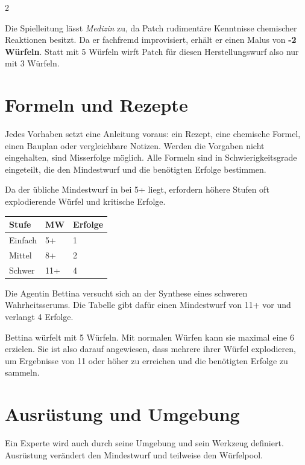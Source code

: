 \begin{multicols}{2}
\begin{pexample}[Beispiel]
Die Spielleitung lässt \textit{Medizin} zu, da Patch rudimentäre Kenntnisse chemischer Reaktionen besitzt. Da er fachfremd improvisiert, erhält er einen Malus von \textbf{-2 Würfeln}. Statt mit 5 Würfeln wirft Patch für diesen Herstellungswurf also nur mit 3 Würfeln.
\end{pexample}

\section{Formeln und Rezepte}

Jedes Vorhaben setzt eine Anleitung voraus: ein Rezept, eine chemische Formel, einen Bauplan oder vergleichbare Notizen. Werden die Vorgaben nicht eingehalten, sind Misserfolge möglich. Alle Formeln sind in Schwierigkeitsgrade eingeteilt, die den Mindestwurf und die benötigten Erfolge bestimmen.

Da der übliche Mindestwurf in  bei 5+ liegt, erfordern höhere Stufen oft explodierende Würfel und kritische Erfolge.

\begin{center}
\begin{tabular}{@{}lll@{}}
\toprule
\textbf{Stufe} & \textbf{MW} & \textbf{Erfolge}\\
\midrule
Einfach & 5+ & 1\\
Mittel & 8+ & 2\\
Schwer & 11+ & 4\\
\bottomrule
\end{tabular}
\end{center}

\begin{pexample}[Beispiel]
Die Agentin Bettina versucht sich an der Synthese eines schweren Wahrheitsserums. Die Tabelle gibt dafür einen Mindestwurf von 11+ vor und verlangt 4 Erfolge.

Bettina würfelt mit 5 Würfeln. Mit normalen Würfen kann sie maximal eine 6 erzielen. Sie ist also darauf angewiesen, dass mehrere ihrer Würfel explodieren, um Ergebnisse von 11 oder höher zu erreichen und die benötigten Erfolge zu sammeln.
\end{pexample}

\section{Ausrüstung und Umgebung}

Ein Experte wird auch durch seine Umgebung und sein Werkzeug definiert. Ausrüstung verändert den Mindestwurf und teilweise den Würfelpool.


\end{multicols}
